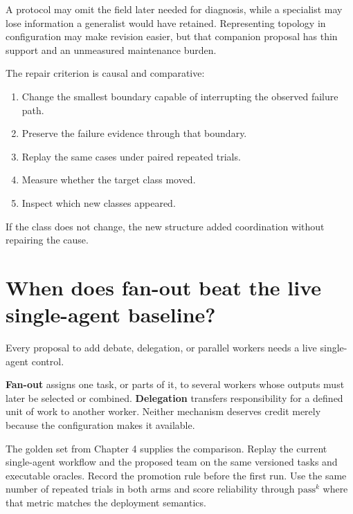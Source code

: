 A protocol may omit the field later needed for diagnosis, while a specialist may lose information a generalist would have retained. Representing topology in configuration may make revision easier, but that companion proposal has thin support and an unmeasured maintenance burden.


The repair criterion is causal and comparative:

\begin{enumerate}
\def\labelenumi{\arabic{enumi}.}
\tightlist
\item
  Change the smallest boundary capable of interrupting the observed failure path.
\item
  Preserve the failure evidence through that boundary.
\item
  Replay the same cases under paired repeated trials.
\item
  Measure whether the target class moved.
\item
  Inspect which new classes appeared.
\end{enumerate}

If the class does not change, the new structure added coordination without repairing the cause.

\hypertarget{when-does-fan-out-beat-the-live-single-agent-baseline}{%
\section{When does fan-out beat the live single-agent baseline?}\label{when-does-fan-out-beat-the-live-single-agent-baseline}}

Every proposal to add debate, delegation, or parallel workers needs a live single-agent control.

\textbf{Fan-out} assigns one task, or parts of it, to several workers whose outputs must later be selected or combined. \textbf{Delegation} transfers responsibility for a defined unit of work to another worker. Neither mechanism deserves credit merely because the configuration makes it available.

The golden set from Chapter 4 supplies the comparison. Replay the current single-agent workflow and the proposed team on the same versioned tasks and executable oracles. Record the promotion rule before the first run. Use the same number of repeated trials in both arms and score reliability through \(\mathrm{pass}^{k}\) where that metric matches the deployment semantics.

